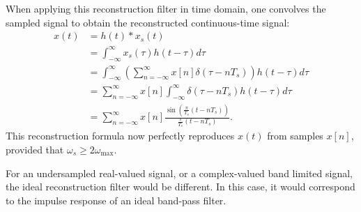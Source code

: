 When applying this reconstruction filter in time domain, one convolves the sampled signal to obtain the 
reconstructed continuous-time signal:
\begin{align}
  x(t) & = h(t)*x_s(t)                                                                                            \\
       & = \int_{-\infty}^{\infty} x_s(\tau)h(t-\tau)d\tau                                                        \\
       & = \int_{-\infty}^{\infty}\left( \sum_{n=-\infty}^{\infty} x[n] \delta(\tau-n T_s)\right) h(t-\tau) d\tau \\
       & = \sum_{n=-\infty}^{\infty} x[n] \int_{-\infty}^{\infty} \delta(\tau-nT_s) h(t-\tau)d\tau                \\
       & = \sum_{n=-\infty}^{\infty} x[n] \frac{\sin(\frac{\pi}{T_s}(t-n T_s))}{\frac{\pi}{T_s}(t-nT_s)}.
\end{align}
This reconstruction formula now perfectly reproduces $x(t)$ from
samples $x[n]$, provided that $\omega_s \ge 2\omega_{\mathrm{max}}$.

For an undersampled real-valued signal, or a complex-valued band limited signal, the ideal reconstruction 
filter would be different. In this case, it would correspond to the impulse response of an ideal band-pass filter.
